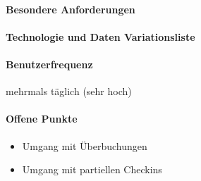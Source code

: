 \paragraph{Besondere Anforderungen}

\paragraph{Technologie und Daten Variationsliste}

\paragraph{Benutzerfrequenz}
mehrmals täglich (sehr hoch)

\paragraph{Offene Punkte}
\begin{itemize}
	\item Umgang mit Überbuchungen
	\item Umgang mit partiellen Checkins
\end{itemize}

\newpage

